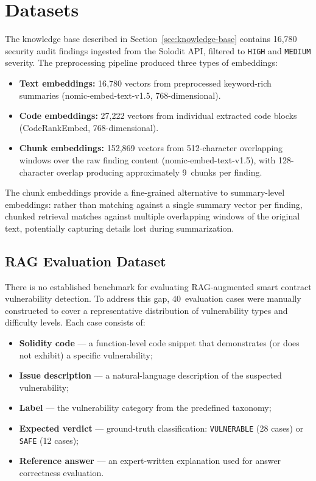 \section{Datasets}
\label{sec:dataset}

The knowledge base described in Section~\ref{sec:knowledge-base} contains 16{,}780 security audit findings ingested from the Solodit API, filtered to \texttt{HIGH} and \texttt{MEDIUM} severity. The preprocessing pipeline produced three types of embeddings:

\begin{itemize}
    \item \textbf{Text embeddings:} 16{,}780 vectors from preprocessed keyword-rich summaries (nomic-embed-text-v1.5, 768-dimensional).
    \item \textbf{Code embeddings:} 27{,}222 vectors from individual extracted code blocks (CodeRankEmbed, 768-dimensional).
    \item \textbf{Chunk embeddings:} 152{,}869 vectors from 512-character overlapping windows over the raw finding content (nomic-embed-text-v1.5), with 128-character overlap producing approximately 9~chunks per finding.
\end{itemize}

The chunk embeddings provide a fine-grained alternative to summary-level embeddings: rather than matching against a single summary vector per finding, chunked retrieval matches against multiple overlapping windows of the original text, potentially capturing details lost during summarization.

\subsection{RAG Evaluation Dataset}
\label{subsec:eval-cases}

There is no established benchmark for evaluating RAG-augmented smart contract vulnerability detection. To address this gap, 40~evaluation cases were manually constructed to cover a representative distribution of vulnerability types and difficulty levels. Each case consists of:

\begin{itemize}
    \item \textbf{Solidity code} --- a function-level code snippet that demonstrates (or does not exhibit) a specific vulnerability;
    \item \textbf{Issue description} --- a natural-language description of the suspected vulnerability;
    \item \textbf{Label} --- the vulnerability category from the predefined taxonomy;
    \item \textbf{Expected verdict} --- ground-truth classification: \texttt{VULNERABLE} (28 cases) or \texttt{SAFE} (12 cases);
    \item \textbf{Reference answer} --- an expert-written explanation used for answer correctness evaluation.
\end{itemize}

